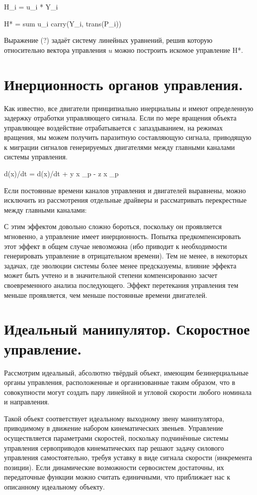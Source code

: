 \documentclass[a4paper]{article}
\begin{document}
H_i = u_i * Y_i

H* = sum u_i carry(Y_i, trans(P_i))  

Выражение (?) задаёт систему линейных уравнений, решив которую относительно вектора управления $u$ можно построить искомое управление H*.

\section{Инерционность органов управления.}
Как известно, все двигатели принципиально инерциальны и имеют определенную задержку отработки управляющего сигнала. Если по мере вращения объекта управляющее воздействие отрабатывается с запаздыванием, на режимах вращения, мы можем получить паразитную составляющую сигнала, приводящую к миграции сигналов генерируемых двигателями между главными каналами системы управления. 


d(x)/dt = d(x)/dt + y x \omega_p - z x \omega_p 

Если постоянные времени каналов управления и двигателей выравнены, можно исключить из рассмотрения отдельные драйверы и рассматривать перекрестные между главными каналами:



С этим эффектом довольно сложно бороться, поскольку он проявляется мгновенно, а управление имеет инерционность. Попытка предкомпенсировать этот эффект в общем случае невозможна (ибо приводит к необходимости генерировать управление в отрицательном времени). Тем не менее, в некоторых задачах, где эволюции системы более менее предсказуемы, влияние эффекта может быть учтено и в значительной степени компенсированно засчет своевременного анализа последующего. Эффект перетекания управления тем меньше проявляется, чем меньше постоянные времени двигателей. 

\section{Идеальный манипулятор. Скоростное управление.}
Рассмотрим идеальный, абсолютно твёрдый объект, имеющим безинерциальные органы управления, расположенные и организованные таким образом, что в совокупности могут создать пару линейной и угловой скорости любого номинала и направления.

Такой объект соответствует идеальному выходному звену манипулятора, приводимому в движение набором кинематических звеньев. Управление осуществляется параметрами скоростей, поскольку подчинённые системы управления сервоприводов кинематических пар решают задачу силового управления самостоятельно, требуя уставку в виде сигнала скорости (инкремента позиции). Если динамические возможности сервосистем достаточны, их передаточные функции можно считать единичными, что приближает нас к описанному идеальному объекту.
\end{document}
